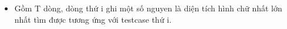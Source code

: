 \begin{itemize}
	\item Gồm T dòng, dòng thứ i ghi một số nguyen là diện tích hình chữ nhất lớn nhất tìm được tương ứng với testcase thứ i.
\end{itemize}

\